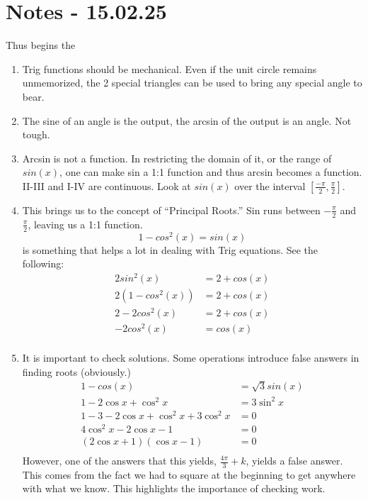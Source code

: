 \documentclass[11pt]{article}
\begin{document}
\section{Notes - 15.02.25}
Thus begins the 
\begin{enumerate}
	\item Trig functions should be mechanical.  Even if the unit circle remains unmemorized, the 2 special triangles can be used to bring any special angle to bear.
	\item The sine of an angle is the output, the arcsin of the output is an angle.  Not tough.
	\item Arcsin is not a function.  In restricting the domain of it, or the range of $sin(x)$, one can make sin a 1:1 function and thus arcsin becomes a function.  II-III and I-IV are continuous.  Look at $sin(x)$ over the interval $\left[ \frac{-\pi}{2}, \frac{\pi}{2}\right]$.
	\item This brings us to the concept of ``Principal Roots.'' Sin runs between $-\frac{\pi}{2}$ and $\frac{\pi}{2}$, leaving us a 1:1 function. 
	$$ 1 - cos^2(x) = sin(x) $$ is something that helps a lot in dealing with Trig equations.  See the following:
	\begin{align*}
		2sin^2(x) &= 2 + cos(x) \\
		2\left(1 - cos^2(x)\right) &= 2 + cos(x) \\
		2 - 2cos^2(x) &= 2 + cos(x) \\
		-2cos^2(x) &= cos(x) \\ 
	\end{align*}
\item It is important to check solutions.  Some operations introduce false answers in finding roots (obviously.)
	\begin{align*}
		1-cos(x) &= \sqrt{3} sin(x) \\
		1 - 2\cos{x}+\cos^2x &= 3\sin^2x \\ 
		1 - 3 - 2\cos{x} + \cos^2x + 3\cos^2x &= 0 \\
		4\cos^2x - 2\cos x -1 &= 0 \\
		(2\cos x + 1)(\cos x -1) &= 0 \\
	\end{align*}
	However, one of the answers that this yields, $\frac{4\pi}{3}+k$, yields a false answer.  This comes from the fact we had to square at the beginning to get anywhere with what we know.  This highlights the importance of checking work.
\end{enumerate}
\end{document}
